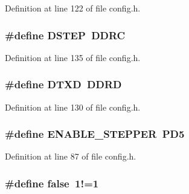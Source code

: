 Definition at line 122 of file config.\-h.

\hypertarget{group__biba__config_gafec4ba65dc31b3c5c4ca6a3471054994}{
\subsubsection[{D\-S\-T\-E\-P}]{\setlength{\rightskip}{0pt plus 5cm}\#define D\-S\-T\-E\-P~D\-D\-R\-C}}\label{group__biba__config_gafec4ba65dc31b3c5c4ca6a3471054994}


Definition at line 135 of file config.\-h.

\hypertarget{group__biba__config_gafcb7b56ec9ef5d20fcc86f61034a6a73}{
\subsubsection[{D\-T\-X\-D}]{\setlength{\rightskip}{0pt plus 5cm}\#define D\-T\-X\-D~D\-D\-R\-D}}\label{group__biba__config_gafcb7b56ec9ef5d20fcc86f61034a6a73}


Definition at line 130 of file config.\-h.

\hypertarget{group__biba__config_gaf43f2237d47f7e2e48d74999befaa9fd}{
\subsubsection[{E\-N\-A\-B\-L\-E\-\_\-\-S\-T\-E\-P\-P\-E\-R}]{\setlength{\rightskip}{0pt plus 5cm}\#define E\-N\-A\-B\-L\-E\-\_\-\-S\-T\-E\-P\-P\-E\-R~P\-D5}}\label{group__biba__config_gaf43f2237d47f7e2e48d74999befaa9fd}


Definition at line 87 of file config.\-h.

\hypertarget{group__biba__config_ga65e9886d74aaee76545e83dd09011727}{
\subsubsection[{false}]{\setlength{\rightskip}{0pt plus 5cm}\#define false~1!=1}}\label{group__biba__config_ga65e9886d74aaee76545e83dd09011727}


